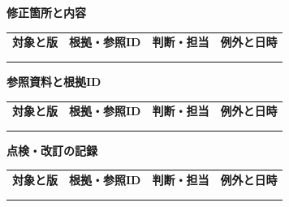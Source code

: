 \documentclass[11pt,a4paper]{article}
\begin{document}
\par{}\noindent\textbf{修正箇所と内容}\par\vspace{1mm}
{\fontsize{8.5}{13}\selectfont
\begin{tabularx}{\linewidth}{@{}XXXX@{}}
\textbf{対象と版} & \textbf{根拠・参照ID} & \textbf{判断・担当} & \textbf{例外と日時}\\[2mm]
\strut & \strut & \strut & \strut\\[5mm]
\strut & \strut & \strut & \strut\\[5mm]
\end{tabularx}
}\vspace{2mm}\par
{}
\par{}\noindent\textbf{参照資料と根拠ID}\par\vspace{1mm}
{\fontsize{8.5}{13}\selectfont
\begin{tabularx}{\linewidth}{@{}XXXX@{}}
\textbf{対象と版} & \textbf{根拠・参照ID} & \textbf{判断・担当} & \textbf{例外と日時}\\[2mm]
\strut & \strut & \strut & \strut\\[5mm]
\strut & \strut & \strut & \strut\\[5mm]
\end{tabularx}
}\vspace{2mm}\par
{}
\par{}\noindent\textbf{点検・改訂の記録}\par\vspace{1mm}
{\fontsize{8.5}{13}\selectfont
\begin{tabularx}{\linewidth}{@{}XXXX@{}}
\textbf{対象と版} & \textbf{根拠・参照ID} & \textbf{判断・担当} & \textbf{例外と日時}\\[2mm]
\strut & \strut & \strut & \strut\\[5mm]
\strut & \strut & \strut & \strut\\[5mm]
\end{tabularx}
}\vspace{2mm}\par
\end{document}
